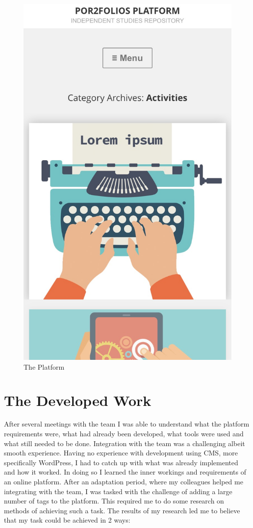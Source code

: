 \documentclass[a4paper,12pt,journal,twoside,compsoc]{PPIEEEtran}
\begin{document}
\begin{figure}[htb]
	\centering
	\includegraphics[width=1\linewidth]{mobile.png}
	\caption{The Platform}
	\label{fig_sim}
\end{figure}

\section{The Developed Work} 
After several meetings with the team I was able to understand what the platform requirements were, what had already been developed, what tools were used and what still needed to be done. Integration with the team was a challenging albeit smooth experience. Having no experience with development using \ac{CMS}, more specifically WordPress,  I had to catch up with what was already implemented and how it worked. In doing so I learned the inner workings and requirements of an online platform. After an adaptation period, where my colleagues helped me integrating with the team, I was tasked with the challenge of adding a large number of tags to the platform. This required me to do some research on methods of achieving such a task. The results of my research led me to believe that my task could be achieved in 2 ways:
\end{document}
